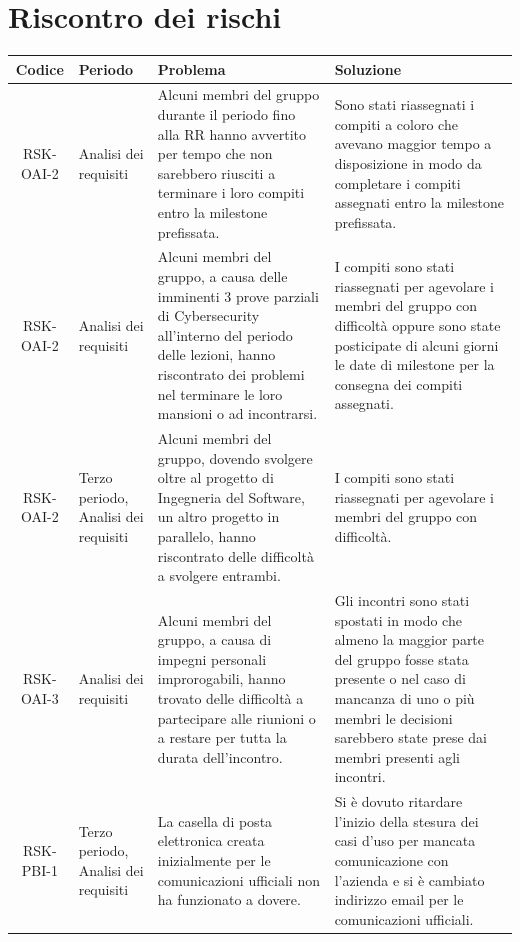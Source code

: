 \appendix
{}

	\section{Riscontro dei rischi}

		\begin{center}
			\begin{longtable}{|c|p{3cm}|p{4cm}|p{4cm}|}
			\hline
			\rowcolor{lighter-grayer}
			\textbf{Codice} & \textbf{Periodo} & \textbf{Problema} & \textbf{Soluzione} \\
			\hline
			\endfirsthead

			\hline
			RSK-OAI-2 & Analisi dei requisiti & Alcuni membri del gruppo durante il periodo fino alla RR hanno avvertito per tempo che non sarebbero riusciti a terminare i loro compiti entro la milestone prefissata. & Sono stati riassegnati i compiti a coloro che avevano maggior tempo a disposizione in modo da completare i compiti assegnati entro la milestone prefissata. \\
			\hline
			RSK-OAI-2 & Analisi dei requisiti & Alcuni membri del gruppo, a causa delle imminenti 3 prove parziali di Cybersecurity all'interno del periodo delle lezioni, hanno riscontrato dei problemi nel terminare le loro mansioni o ad incontrarsi. & I compiti sono stati riassegnati per agevolare i membri del gruppo con difficoltà oppure sono state posticipate di alcuni giorni le date di milestone per la consegna dei compiti assegnati.  \\
			\hline
			RSK-OAI-2 & Terzo periodo, Analisi dei requisiti & Alcuni membri del gruppo, dovendo svolgere oltre al progetto di Ingegneria del Software, un altro progetto in parallelo, hanno riscontrato delle difficoltà a svolgere entrambi. & I compiti sono stati riassegnati per agevolare i membri del gruppo con difficoltà.  \\
			\hline
			RSK-OAI-3 & Analisi dei requisiti & Alcuni membri del gruppo, a causa di impegni personali improrogabili, hanno trovato delle difficoltà a partecipare alle riunioni o a restare per tutta la durata dell'incontro. & Gli incontri sono stati spostati in modo che almeno la maggior parte del gruppo fosse stata presente o nel caso di mancanza di uno o più membri le decisioni sarebbero state prese dai membri presenti agli incontri. \\
			\hline
			RSK-PBI-1 & Terzo periodo, Analisi dei requisiti & La casella di posta elettronica creata inizialmente per le comunicazioni ufficiali non ha funzionato a dovere. & Si è dovuto ritardare l'inizio della stesura dei casi d'uso per mancata comunicazione con l'azienda e si è cambiato indirizzo email per le comunicazioni ufficiali. \\

\end{longtable}
\end{center}
